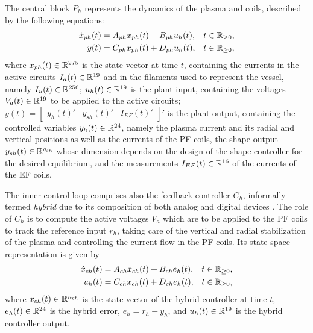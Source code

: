 The central block $P_h$ represents the dynamics of the plasma and coils, described by the following equations:
\begin{subequations}
  \label{eq:tcv_ph}
  \begin{align}
    \dot{x}_{ph}(t) &= A_{ph}x_{ph}(t) + B_{ph}u_{h}(t), & t\in\mathbb{R}_{\geq 0},\\
    y(t) &= C_{ph}x_{ph}(t) + D_{ph}u_{h}(t), & t\in\mathbb{R}_{\geq 0},
  \end{align}
\end{subequations}
where $x_{ph}(t)\in\mathbb{R}^{275}$ is the state vector at time $t$, containing the currents in the active circuits $I_a(t)\in\mathbb{R}^{19}$ and in the filaments used to represent the vessel, namely $I_u(t)\in\mathbb{R}^{256}$; $u_{h}(t)\in\mathbb{R}^{19}$ is the plant input, containing the voltages $V_a(t)\in\mathbb{R}^{19}$ to be applied to the active circuits; $y(t) = \begin{bmatrix}y_h(t)' & y_{sh}(t)' & I_{EF}(t)'\end{bmatrix}'$ is the plant output, containing the controlled variables $y_h(t)\in\mathbb{R}^{24}$, namely the plasma current and its radial and vertical positions as well as the currents of the PF coils, the shape output $y_{sh}(t)\in\mathbb{R}^{q_{sh}}$ whose dimension depends on the design of the shape controller for the desired equilibrium, and the measurements $I_{EF}(t)\in\mathbb{R}^{16}$ of the currents of the EF coils.

The inner control loop comprises also the feedback controller $C_h$, informally termed \emph{hybrid} due to its composition of both analog and digital devices \cite{lister_control_1997}. The role of $C_h$ is to compute the active voltages $V_a$ which are to be applied to the PF coils to track the reference input $r_h$, taking care of the vertical and radial stabilization of the plasma and controlling the current flow in the PF coils. Its state-space representation is given by
\begin{subequations}
  \label{eq:tcv_ch}
  \begin{align}
    \dot{x}_{ch}(t) &= A_{ch}x_{ch}(t) + B_{ch}e_h(t), & t\in\mathbb{R}_{\geq 0},\\
    u_h(t) &= C_{ch}x_{ch}(t) + D_{ch}e_h(t), & t\in\mathbb{R}_{\geq 0},
  \end{align}
\end{subequations}
where $x_{ch}(t)\in\mathbb{R}^{n_{ch}}$ is the state vector of the hybrid controller at time $t$, $e_h(t)\in\mathbb{R}^{24}$ is the hybrid error, $e_h = r_h - y_h$, and $u_h(t)\in\mathbb{R}^{19}$ is the hybrid controller output.

